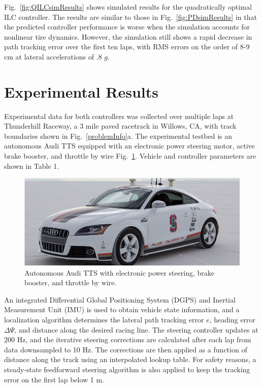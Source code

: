 \documentclass[letterpaper, 10 pt, conference]{ieeeconf}  %
\begin{document}
Fig.~\ref{fig:QILCsimResults} shows simulated results for the quadratically optimal ILC controller. The results are similar to those in Fig.~\ref{fig:PDsimResults} in that the predicted controller performance
is worse when the simulation accounts for nonlinear tire dynamics. However, the simulation still shows a rapid decrease in path tracking error over the first ten laps, with RMS errors on the order
of 8-9 cm at lateral accelerations of .8 $g$. 


\section{Experimental Results}

Experimental data for both controllers was collected over multiple laps at Thunderhill Raceway, a 3 mile paved racetrack in Willows, CA, with track boundaries shown in Fig.~\ref{problemInfo}a. The experimental testbed is an autonomous Audi TTS
equipped with an electronic power steering motor, active brake booster, and throttle by wire Fig.~\ref{fig:shelleyPic}. Vehicle
and controller parameters are shown in Table 1. 

\begin{figure}
\centering
\includegraphics[width=3.5 in]{figures/shelleyPic.png}
\caption{Autonomous Audi TTS with electronic power steering, brake booster, and throttle by wire.}
\label{fig:shelleyPic}
\end{figure}

An integrated Differential Global Positioning System (DGPS) and Inertial Measurement Unit (IMU) is used to obtain vehicle state information, and a localization algorithm 
determines the lateral path tracking error $e$, heading error $\Delta\Psi$, and distance along the desired racing line. The steering controller updates at 200 Hz, 
and the iterative steering corrections are calculated after each lap from data downsampled to 10 Hz. The corrections are then applied as a function of distance along the track using an
interpolated lookup table. For safety reasons, a steady-state feedforward steering algorithm \cite{kapania} is also applied to keep the tracking error on the first lap below 1 m. 
\end{document}
